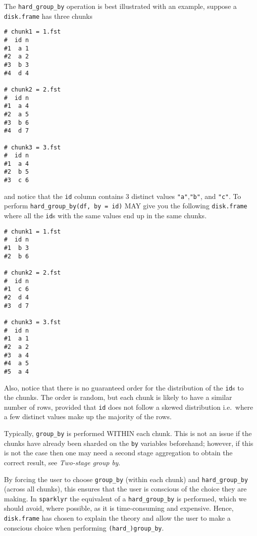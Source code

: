 \documentclass[]{book}
\begin{document}
The \texttt{hard\_group\_by} operation is best illustrated with an example, suppose a \texttt{disk.frame} has three chunks

\begin{verbatim}
# chunk1 = 1.fst
#  id n
#1  a 1
#2  a 2
#3  b 3
#4  d 4

# chunk2 = 2.fst
#  id n
#1  a 4
#2  a 5
#3  b 6
#4  d 7

# chunk3 = 3.fst
#  id n
#1  a 4
#2  b 5
#3  c 6
\end{verbatim}

and notice that the \texttt{id} column contains 3 distinct values \texttt{"a"},\texttt{"b"}, and \texttt{"c"}. To perform \texttt{hard\_group\_by(df,\ by\ =\ id)} MAY give you the following \texttt{disk.frame} where all the \texttt{id}s with the same values end up in the same chunks.

\begin{verbatim}
# chunk1 = 1.fst
#  id n
#1  b 3
#2  b 6

# chunk2 = 2.fst
#  id n
#1  c 6
#2  d 4
#3  d 7

# chunk3 = 3.fst
#  id n
#1  a 1
#2  a 2
#3  a 4
#4  a 5
#5  a 4
\end{verbatim}

Also, notice that there is no guaranteed order for the distribution of the \texttt{id}s to the chunks. The order is random, but each chunk is likely to have a similar number of rows, provided that \texttt{id} does not follow a skewed distribution i.e.~where a few distinct values make up the majority of the rows.

Typically, \texttt{group\_by} is performed WITHIN each chunk. This is not an issue if the chunks have already been sharded on the \texttt{by} variables beforehand; however, if this is not the case then one may need a second stage aggregation to obtain the correct result, see \emph{Two-stage group by}.

By forcing the user to choose \texttt{group\_by} (within each chunk) and \texttt{hard\_group\_by} (across all chunks), this ensures that the user is conscious of the choice they are making. In \texttt{sparklyr} the equivalent of a \texttt{hard\_group\_by} is performed, which we should avoid, where possible, as it is time-consuming and expensive. Hence, \texttt{disk.frame} has chosen to explain the theory and allow the user to make a conscious choice when performing \texttt{(hard\_)group\_by}.
\end{document}
